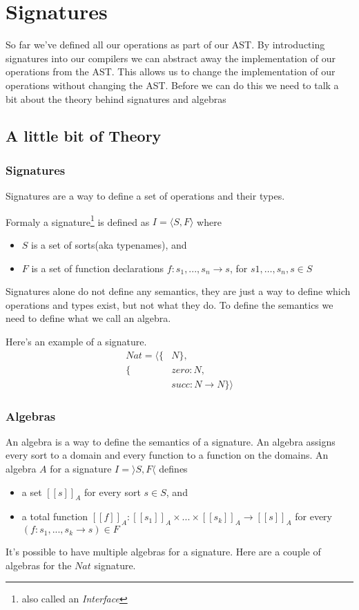 \chapter{Signatures}
So far we've defined all our operations as part of our AST. 
By introducting signatures into our compilers we can abstract away the implementation of our operations from the AST.
This allows us to change the implementation of our operations without changing the AST.
Before we can do this we need to talk a bit about the theory behind signatures and algebras

\section{A little bit of Theory}

\subsection{Signatures}
Signatures are a way to define a set of operations and their types.

Formaly a signature\footnote{also called an \textit{Interface}} is defined as $I = \langle S,F \rangle$ where
\begin{itemize}
    \item $S$ is a set of sorts(aka typenames), and
    \item $F$ is a set of function declarations $f: s_1, ..., s_n \rightarrow s$, for $s1, \dots, s_n, s \in S$
\end{itemize}
Signatures alone do not define any semantics, they are just a way to define which operations and types exist, but not what they do.
To define the semantics we need to define what we call an algebra.

Here's an example of a signature.
\begin{align*}
    Nat = \langle \{&N\},\\ 
                  \{&zero: N,\\
                    &succ: N \rightarrow N\} \rangle
\end{align*}

\subsection{Algebras}
An algebra is a way to define the semantics of a signature.
An algebra assigns every sort to a domain and every function to a function on the domains.
An algebra $A$ for a signature $I = \rangle S,F \langle$ defines
\begin{itemize}
    \item a set $[\![s]\!]_A$ for every sort $s \in S$, and
    \item a total function $[\![f]\!]_A : [\![s_1]\!]_A \times ... \times [\![s_k]\!]_A \rightarrow [\![s]\!]_A$ for every  $(f: s_1, ... , s_k \rightarrow s) \in F$
\end{itemize}
It's possible to have multiple algebras for a signature.
Here are a couple of algebras for the $Nat$ signature.

